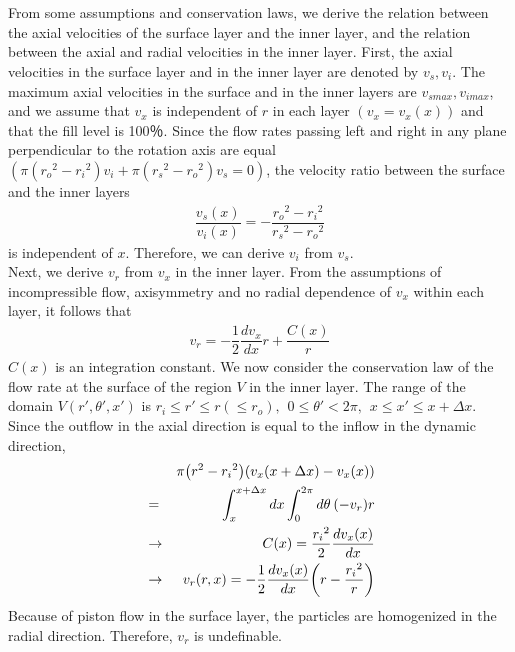 \documentclass[prl,twocolumn,superscriptaddress]{revtex4}
\begin{document}
\\
 \\
From some assumptions and conservation laws, we derive the relation between the axial velocities of the surface layer and the inner layer, and the relation between the axial and radial velocities in the inner layer. First, the axial velocities in the surface layer and in the inner layer are denoted by $v_s, v_i$. The maximum axial velocities in the surface and in the inner layers are $v_{smax}, v_{imax}$, and we assume that $v_x$ is independent of $r$ in each layer $(v_x=v_x(x))$ and that the fill level is 100％. Since the flow rates passing left and right in any plane perpendicular to the rotation axis are equal $(\pi({r_o}^2-{r_i}^2)v_i+\pi({r_s}^2-{r_o}^2)v_s = 0)$, the velocity ratio between the surface and the inner layers \\
\begin{eqnarray} \label{eq:in_surf}
\dfrac{v_s(x)}{v_i(x)} = -\dfrac{{r_o}^2-{r_i}^2}{{r_s}^2-{r_o}^2}
\end{eqnarray}
is independent of $x$. Therefore, we can derive $v_i$ from $v_s$. \\

Next, we derive $v_r$ from $v_x$ in the inner layer. 
From the assumptions of incompressible flow, axisymmetry and no radial dependence of $v_x$ within each layer, it follows that \\
\begin{eqnarray}
v_r = -\dfrac{1}{2}\dfrac{dv_x}{dx}r+\dfrac{C(x)}{r}
\end{eqnarray}
$C(x)$ is an integration constant. We now consider the conservation law of the flow rate at the surface of the region $V$ in the inner layer. The range of the domain $V(r',\theta',x')$ is $r_i\leq r'\leq r(\leq r_o),\hspace{5pt}0\leq \theta'<2\pi,\hspace{5pt}x\leq x'\leq x+\Delta x$. Since the outflow in the axial direction is equal to the inflow in the dynamic direction, \\
\begin{eqnarray} \label{eq:vx_vr}
&& \pi\qty(r^2-{r_i}^2)\qty(v_x(x+\Delta x)-v_x(x))\nonumber \\
&=& \displaystyle\int_{x}^{x+\Delta x}dx\int_{0}^{2\pi}d\theta\hspace{2pt}(-v_r)r\nonumber \\
&\rightarrow& C(x) = \dfrac{{r_i}^2}{2}\dfrac{dv_x(x)}{dx}\nonumber \\
&\rightarrow& v_r(r,x) = -\dfrac{1}{2}\dfrac{dv_x(x)}{dx}\qty(r-\dfrac{{r_i}^2}{r})
\end{eqnarray}
Because of piston flow in the surface layer, the particles are homogenized in the radial direction. Therefore, $v_r$ is undefinable. \\
\end{document}
